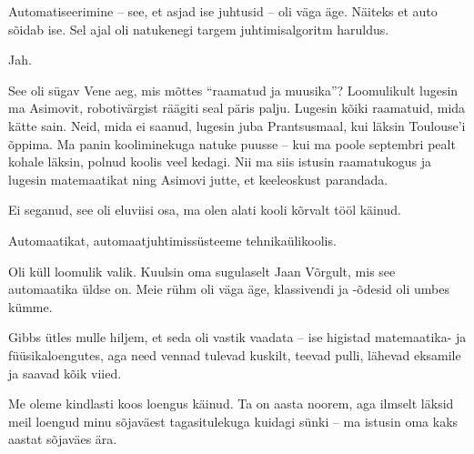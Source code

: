 
Automatiseerimine – see, et asjad ise juhtusid – oli väga äge. Näiteks et
auto sõidab ise. Sel ajal oli natukenegi targem 
juhtimisalgoritm haruldus.


Jah.


See oli sügav Vene aeg, mis mõttes \enquote{raamatud ja muusika}? 
Loomulikult lugesin ma Asimovit, robotivärgist räägiti seal päris palju. Lugesin kõiki 
raamatuid, mida kätte sain. Neid, mida ei saanud, lugesin 
juba Prantsusmaal, kui läksin Toulouse'i õppima. Ma panin 
kooliminekuga natuke puusse – kui ma poole septembri pealt kohale läksin, 
polnud koolis veel kedagi. Nii ma siis 
istusin raamatukogus ja lugesin matemaatikat ning Asimovi jutte, et keeleoskust parandada.


Ei seganud, see oli eluviisi osa, ma olen alati kooli kõrvalt tööl 
käinud.


Automaatikat, automaatjuhtimissüsteeme tehnikaülikoolis.


Oli küll loomulik valik. Kuulsin oma sugulaselt Jaan 
Võrgult, mis 
see automaatika üldse on. Meie rühm oli väga äge, klassivendi ja -õdesid
oli umbes kümme. 

Gibbs ütles mulle hiljem, et seda oli 
vastik vaadata – ise higistad matemaatika- ja füüsikaloengutes, aga 
need vennad tulevad kuskilt, teevad pulli, lähevad eksamile ja saavad 
kõik viied. 


Me oleme kindlasti koos loengus käinud. Ta on aasta noorem, aga ilmselt läksid meil loengud minu sõjaväest tagasitulekuga kuidagi sünki – ma istusin oma kaks aastat sõjaväes ära.

